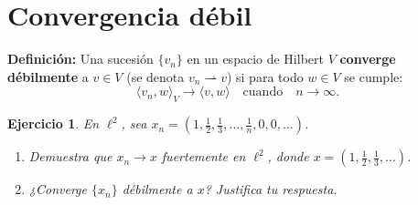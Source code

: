 \documentclass[11pt]{report}
\newtheorem{ex}{Ejercicio}
\begin{document}
\section{Convergencia débil}

\textbf{Definición:}
Una sucesión \( \{v_n\} \) en un espacio de Hilbert \( V \) \textbf{converge débilmente} a \( v \in V \) (se denota \( v_n \rightharpoonup v \)) si para todo \( w \in V \) se cumple:
\[
\langle v_n, w \rangle_V \to \langle v, w \rangle \quad \text{cuando} \quad n \to \infty.
\]

\vspace{1em}



\begin{ex}
  En \( \ell^2 \), sea \( x_n = \left(1, \frac{1}{2}, \frac{1}{3}, \dots, \frac{1}{n}, 0, 0, \dots \right) \).
  \begin{enumerate}
    \item Demuestra que \( x_n \to x \) fuertemente en \( \ell^2 \), donde \( x = \left(1, \frac{1}{2}, \frac{1}{3}, \dots \right) \).
    \item ¿Converge \( \{x_n\} \) débilmente a \( x \)? Justifica tu respuesta.
  \end{enumerate}

\end{ex}
\end{document}
